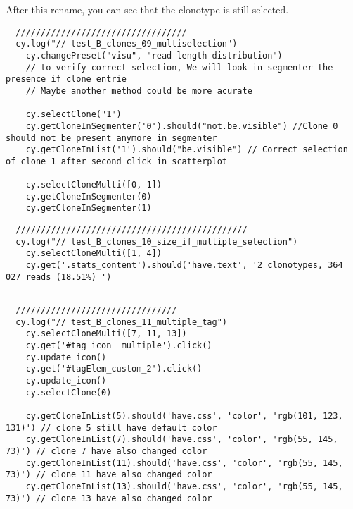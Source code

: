 \bigskip

After this rename, you can see that the clonotype is still selected.
\begin{verbatim}
  //////////////////////////////////
  cy.log("// test_B_clones_09_multiselection")
    cy.changePreset("visu", "read length distribution")
    // to verify correct selection, We will look in segmenter the presence if clone entrie
    // Maybe another method could be more acurate

    cy.selectClone("1")
    cy.getCloneInSegmenter('0').should("not.be.visible") //Clone 0 should not be present anymore in segmenter
    cy.getCloneInList('1').should("be.visible") // Correct selection of clone 1 after second click in scatterplot

    cy.selectCloneMulti([0, 1])
    cy.getCloneInSegmenter(0)
    cy.getCloneInSegmenter(1)

\end{verbatim}

\begin{verbatim}
  //////////////////////////////////////////////
  cy.log("// test_B_clones_10_size_if_multiple_selection")
    cy.selectCloneMulti([1, 4])
    cy.get('.stats_content').should('have.text', '2 clonotypes, 364 027 reads (18.51%) ')


\end{verbatim}

\begin{verbatim}
  ////////////////////////////////
  cy.log("// test_B_clones_11_multiple_tag")
    cy.selectCloneMulti([7, 11, 13])
    cy.get('#tag_icon__multiple').click()
    cy.update_icon()
    cy.get('#tagElem_custom_2').click()
    cy.update_icon()
    cy.selectClone(0)

    cy.getCloneInList(5).should('have.css', 'color', 'rgb(101, 123, 131)') // clone 5 still have default color
    cy.getCloneInList(7).should('have.css', 'color', 'rgb(55, 145, 73)') // clone 7 have also changed color
    cy.getCloneInList(11).should('have.css', 'color', 'rgb(55, 145, 73)') // clone 11 have also changed color
    cy.getCloneInList(13).should('have.css', 'color', 'rgb(55, 145, 73)') // clone 13 have also changed color


\end{verbatim}

